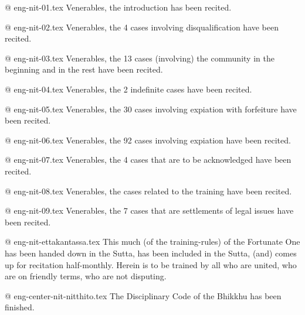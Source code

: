 @ eng-nit-01.tex
Venerables, the introduction has been recited.

@ eng-nit-02.tex
Venerables, the 4 cases involving disqualification have been recited.

@ eng-nit-03.tex
Venerables, the 13 cases (involving) the community in the beginning and in the rest have been recited.

@ eng-nit-04.tex
Venerables, the 2 indefinite cases have been recited.

@ eng-nit-05.tex
Venerables, the 30 cases involving expiation with forfeiture have been recited.

@ eng-nit-06.tex
Venerables, the 92 cases involving expiation have been recited.

@ eng-nit-07.tex
Venerables, the 4 cases that are to be acknowledged have been recited.

@ eng-nit-08.tex
Venerables, the cases related to the training have been recited.

@ eng-nit-09.tex
Venerables, the 7 cases that are settlements of legal issues have been recited.


@ eng-nit-ettakantassa.tex
This much (of the training-rules) of the Fortunate One has been handed down in the Sutta, has been included in the Sutta, (and) comes up for recitation half-monthly. Herein is to be trained by all who are united, who are on friendly terms, who are not disputing.

@ eng-center-nit-nitthito.tex
The Disciplinary Code of the Bhikkhu has been finished.

